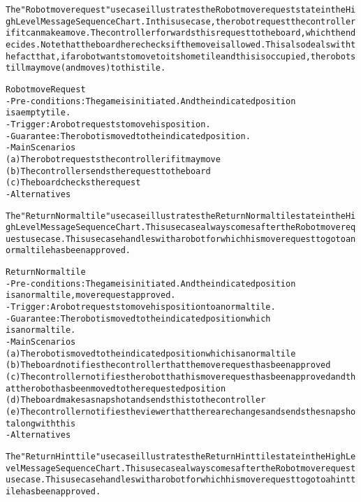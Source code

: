 \begin{alltt}
The "Robot move request" use case illustrates the Robot move request state in the High Level Message Sequence Chart. In this use case, the robot request the controller if it can make a move. The controller forwards this request to the board, which then decides. Note that the board here checks if the move is allowed. This also deals with the fact that, if a robot wants to move to its home tile and this is occupied, the robot still may move (and moves) to this tile.

Robot move Request
- Pre-conditions: The game is initiated. And the indicated position
    is a empty tile.
- Trigger: A robot requests to move his position.
- Guarantee: The robot is moved to the indicated position.
- Main Scenarios
    (a) The robot requests the controller if it may move
    (b) The controller sends the request to the board
    (c) The board checks the request
- Alternatives


The "Return Normal tile" use case illustrates the Return Normal tile state in the High Level Message Sequence Chart. This use case always comes after the Robot move request use case. This use case handles with a robot for which his move request to go to a normal tile has been approved.

Return Normal tile
- Pre-conditions: The game is initiated. And the indicated position
    is a normal tile, move request approved.
- Trigger: A robot requests to move his position to a normal tile.
- Guarantee: The robot is moved to the indicated position which
    is a normal tile.
- Main Scenarios
    (a) The robot is moved to the indicated position which is a normal tile
    (b) The board notifies the controller that the move request has been approved
    (c) The controller notifies the robot that his move request has been approved and that the robot has been moved to the requested position
    (d) The board makes a snapshot and sends this to the controller
    (e) The controller notifies the viewer that there are changes and sends the snapshot along with this
- Alternatives


The "Return Hint tile" use case illustrates the Return Hint tile state in the High Level Message Sequence Chart. This use case always comes after the Robot move request use case. This use case handles with a robot for which his move request to go to a hint tile has been approved.


\end{alltt}
